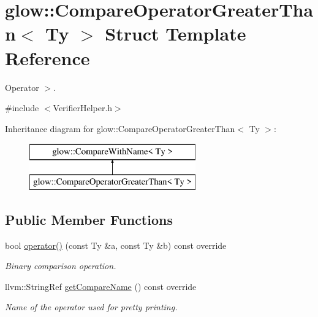 \hypertarget{structglow_1_1_compare_operator_greater_than}{}\section{glow\+:\+:Compare\+Operator\+Greater\+Than$<$ Ty $>$ Struct Template Reference}
\label{structglow_1_1_compare_operator_greater_than}


Operator $>$.  




{\ttfamily \#include $<$Verifier\+Helper.\+h$>$}

Inheritance diagram for glow\+:\+:Compare\+Operator\+Greater\+Than$<$ Ty $>$\+:\begin{figure}[H]
\begin{center}
\leavevmode
\includegraphics[height=2.000000cm]{structglow_1_1_compare_operator_greater_than}
\end{center}
\end{figure}
\subsection*{Public Member Functions}
\begin{DoxyCompactItemize}
\item 
\mbox{\label{structglow_1_1_compare_operator_greater_than_a4080da09fbeecb6303c8affadae517e3}} 
bool \hyperlink{structglow_1_1_compare_operator_greater_than_a4080da09fbeecb6303c8affadae517e3}{operator()} (const Ty \&a, const Ty \&b) const override
\begin{DoxyCompactList}\small\item\em Binary comparison operation. \end{DoxyCompactList}\item 
\mbox{\label{structglow_1_1_compare_operator_greater_than_aab570b49f303c433efd7fd8316a111dc}} 
llvm\+::\+String\+Ref \hyperlink{structglow_1_1_compare_operator_greater_than_aab570b49f303c433efd7fd8316a111dc}{get\+Compare\+Name} () const override
\begin{DoxyCompactList}\small\item\em Name of the operator used for pretty printing. \end{DoxyCompactList}\end{DoxyCompactItemize}


